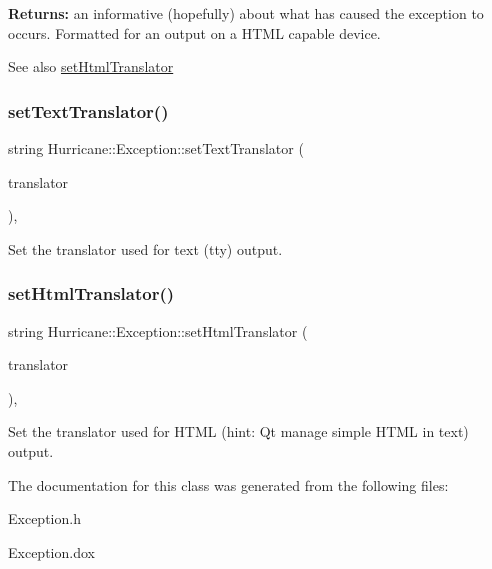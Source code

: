 {\bfseries Returns\+:} an informative (hopefully) about what has caused the exception to occurs. Formatted for an output on a H\+T\+ML capable device.

\begin{DoxySeeAlso}{See also}
\mbox{\hyperlink{classHurricane_1_1Exception_a0effe808df00f4efe10925131304b8d0}{set\+Html\+Translator}} 
\end{DoxySeeAlso}
\mbox{\label{classHurricane_1_1Exception_a1a57fbbc4b57a014558ba31d18ec9b62}} 
\subsubsection{\texorpdfstring{set\+Text\+Translator()}{setTextTranslator()}}
{\footnotesize\ttfamily string Hurricane\+::\+Exception\+::set\+Text\+Translator (\begin{DoxyParamCaption}\item[{const Text\+Translator \&}]{translator }\end{DoxyParamCaption})\hspace{0.3cm}{\ttfamily [inline]}, {\ttfamily [static]}}

Set the translator used for text (tty) output. \mbox{\label{classHurricane_1_1Exception_a0effe808df00f4efe10925131304b8d0}} 
\subsubsection{\texorpdfstring{set\+Html\+Translator()}{setHtmlTranslator()}}
{\footnotesize\ttfamily string Hurricane\+::\+Exception\+::set\+Html\+Translator (\begin{DoxyParamCaption}\item[{const Text\+Translator \&}]{translator }\end{DoxyParamCaption})\hspace{0.3cm}{\ttfamily [inline]}, {\ttfamily [static]}}

Set the translator used for H\+T\+ML (hint\+: Qt manage simple H\+T\+ML in text) output. 

The documentation for this class was generated from the following files\+:\begin{DoxyCompactItemize}
\item 
Exception.\+h\item 
Exception.\+dox\end{DoxyCompactItemize}
